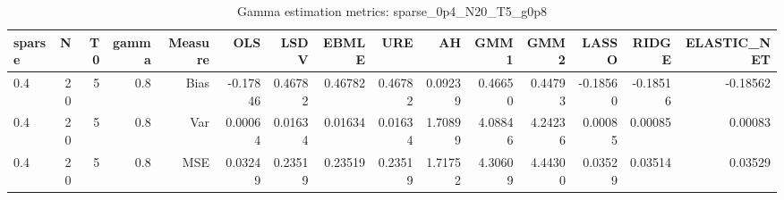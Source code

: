 \begin{table}[!htbp]\centering
\caption{Gamma estimation metrics: sparse_0p4_N20_T5_g0p8}
\label{tab:table1_sparse_0p4_N20_T5_g0p8}
\begin{tabular}{lrrrrrrrrrrrrrr}
\hline
sparse & N & T0 & gamma & Measure & OLS & LSDV & EBMLE & URE & AH & GMM1 & GMM2 & LASSO & RIDGE & ELASTIC_NET \\
\hline
0.4 & 20 & 5 & 0.8 & Bias & -0.17846 & 0.46782 & 0.46782 & 0.46782 & 0.09239 & 0.46650 & 0.44793 & -0.18560 & -0.18516 & -0.18562 \\
0.4 & 20 & 5 & 0.8 & Var & 0.00064 & 0.01634 & 0.01634 & 0.01634 & 1.70899 & 4.08846 & 4.24236 & 0.00085 & 0.00085 & 0.00083 \\
0.4 & 20 & 5 & 0.8 & MSE & 0.03249 & 0.23519 & 0.23519 & 0.23519 & 1.71752 & 4.30609 & 4.44300 & 0.03529 & 0.03514 & 0.03529 \\
\hline
\end{tabular}
\end{table}

